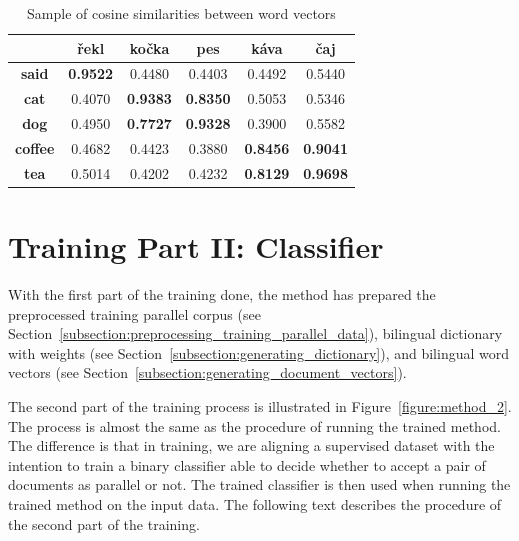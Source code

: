 \begin{table}[!htb]
	\centering
	\caption{Sample of cosine similarities between word vectors}
	\label{table:bivec_word_similarities}
	\vspace{1em}
	\begin{tabular}{|c|ccccc|}
		\hline
		& \textbf{řekl} & \textbf{kočka} & \textbf{pes} & \textbf{káva} & \textbf{čaj} \\
		\hline
		\textbf{said} & \textbf{0.9522} & 0.4480 & 0.4403 & 0.4492 & 0.5440 \\
		\textbf{cat} & 0.4070 & \textbf{0.9383} & \textbf{0.8350} & 0.5053 & 0.5346 \\
		\textbf{dog} & 0.4950 & \textbf{0.7727} & \textbf{0.9328} & 0.3900 & 0.5582 \\
		\textbf{coffee} & 0.4682 & 0.4423 & 0.3880 & \textbf{0.8456} & \textbf{0.9041} \\
		\textbf{tea} & 0.5014 & 0.4202 & 0.4232 & \textbf{0.8129} & \textbf{0.9698} \\ 
		\hline
	\end{tabular}
\end{table}


\section{Training Part II: Classifier}
\label{section:method_training_2}

With the first part of the training done, the method has prepared the preprocessed training parallel corpus (see Section~\ref{subsection:preprocessing_training_parallel_data}), bilingual dictionary with weights (see Section~\ref{subsection:generating_dictionary}), and bilingual word vectors (see Section~\ref{subsection:generating_document_vectors}).

The second part of the training process is illustrated in Figure~\ref{figure:method_2}. The process is almost the same as the procedure of running the trained method. The difference is that in training, we are aligning a supervised dataset with the intention to train a binary classifier able to decide whether to accept a pair of documents as parallel or not. The trained classifier is then used when running the trained method on the input data. The following text describes the procedure of the second part of the training.

